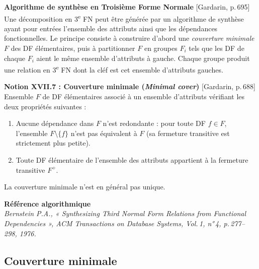 \documentclass[12pt, a4paper]{article}
\newcommand{\citeg}[1]{\textnormal{\footnotesize[#1]}}
\begin{document}
    \begin{rappelbox}
        \textbf{Algorithme de synthèse en Troisième Forme Normale}
        \hfill\citeg{Gardarin, p.\,695}\\[0.5em]
        Une décomposition en 3\textsuperscript{e} FN peut être générée par un algorithme de synthèse ayant
        pour entrées l'ensemble des attributs ainsi que les dépendances fonctionnelles. Le principe consiste à
        construire d'abord une \emph{couverture minimale} $F$ des DF élémentaires, puis à partitionner $F$
        en groupes $F_i$ tels que les DF de chaque $F_i$ aient le même ensemble d'attributs à gauche. Chaque
        groupe produit une relation en 3\textsuperscript{e} FN dont la cléf est cet ensemble d'attributs
        gauches.
    \end{rappelbox}

    \begin{rappelbox}
        \textbf{Notion XVII.7 : Couverture minimale (\textit{Minimal cover})}
        \hfill\citeg{Gardarin, p.\,688}\\[0.5em]
        Ensemble $F$ de DF élémentaires associé à un ensemble d'attributs vérifiant les deux propriétés
        suivantes :
        \begin{enumerate}
            \item Aucune dépendance dans $F$ n'est redondante : pour toute DF $f \in F$, l'ensemble $F \setminus \{f\}$ n'est pas équivalent à $F$ (sa fermeture transitive est strictement plus petite).
            \item Toute DF élémentaire de l'ensemble des attributs appartient à la fermeture transitive $F^+$.
        \end{enumerate}
        La couverture minimale n'est en général pas unique.
    \end{rappelbox}

    \begin{rappelbox}
        \textbf{Référence algorithmique}\\[0.3em]
        \textit{Bernstein P.A., « Synthesizing Third Normal Form Relations from Functional Dependencies »,
            ACM Transactions on Database Systems, Vol.\,1, n°\,4, p.\,277--298, 1976.}
    \end{rappelbox}


    \subsection{Couverture minimale}
\end{document}
